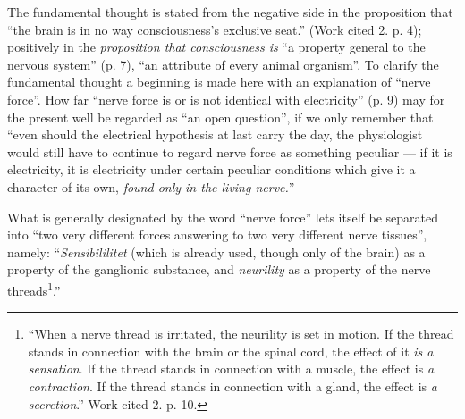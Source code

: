 \documentclass[12pt,a4paper]{book}
\begin{document}
The fundamental thought is stated from the negative side in the proposition that
``the brain is in no way consciousness's exclusive seat.'' (Work cited 2. p. 4);
positively in the \emph{proposition that consciousness is} ``a property general to
the nervous system'' (p. 7), ``an attribute of every animal organism''.
To clarify the fundamental thought a beginning is made here with an explanation of
``nerve force''. How far ``nerve force is or is not identical with electricity''
(p. 9) may for the present well be regarded as ``an open question'', if we only
remember that ``even should the electrical hypothesis at last carry the day, the
physiologist would still have to continue to regard nerve force as something
peculiar --- if it is electricity, it is electricity under certain peculiar
conditions which give it a character of its own, \emph{found only in the living
nerve.}''

\setcounter{footnote}{0}

What is generally designated by the word ``nerve force'' lets itself be separated
into ``two very different forces answering to two very different nerve tissues'',
namely: ``\emph{Sensibililitet} (which is already used, though only of the brain) as
a property of the ganglionic substance, and \emph{neurility} as a property of the
nerve threads\footnote{``When a nerve thread is irritated, the neurility is set in
motion. If the thread stands in connection with the brain or the spinal cord, the
effect of it \emph{is a sensation}. If the thread stands in connection with a
muscle, the effect is \emph{a contraction}. If the thread stands in connection with
a gland, the effect is \emph{a secretion}.'' Work cited 2. p. 10.}.''
\end{document}
